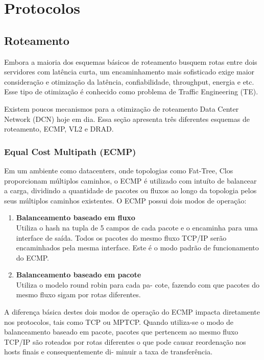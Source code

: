 \documentclass[12pt,a4paper]{report}
\begin{document}
\chapter{Protocolos}

\section{Roteamento}

Embora a maioria dos esquemas básicos de roteamento busquem rotas entre
dois servidores com latência curta, um encaminhamento mais sofisticado exige maior
consideração e otimização da latência, confiabilidade, throughput, energia e etc. Esse tipo
de otimização é conhecido como problema de Traffic Engineering (TE).

Existem poucos mecanismos para a otimização de roteamento Data Center Network (DCN)
hoje em dia. Essa seção apresenta três diferentes esquemas de roteamento, ECMP, VL2 e DRAD.

\subsection{Equal Cost Multipath (ECMP)}

  Em um ambiente como datacenters, onde topologias como Fat-Tree, Clos proporcionam múltiplos caminhos,  
  o ECMP é utilizado com intuíto de balancear a carga, dividindo a quantidade de pacotes ou fluxos ao
  longo da topologia pelos seus múltiplos caminhos existentes. 
  O ECMP possui dois modos de operação:


  \begin{enumerate}
    \item  \textbf{Balanceamento baseado em fluxo}\\  
      Utiliza o hash na tupla de 5 campos de cada
      pacote e o encaminha para uma interface de saída. Todos os pacotes do mesmo
      fluxo TCP/IP serão encaminhados pela mesma interface. Este é o modo padrão de
      funcionamento do ECMP.

    \item \textbf{Balanceamento baseado em pacote}\\
      Utiliza o modelo round robin para cada pa-
      cote, fazendo com que pacotes do mesmo fluxo sigam por rotas diferentes.

  \end{enumerate}

  A diferença básica destes dois modos de operação do ECMP impacta diretamente
  nos protocolos, tais como TCP ou MPTCP. Quando utiliza-se o modo de balanceamento
  baseado em pacote, pacotes que pertencem ao mesmo fluxo TCP/IP são roteados por
  rotas diferentes o que pode causar reordenação nos hosts finais e consequentemente di-
  minuir a taxa de transferência. 
\end{document}
